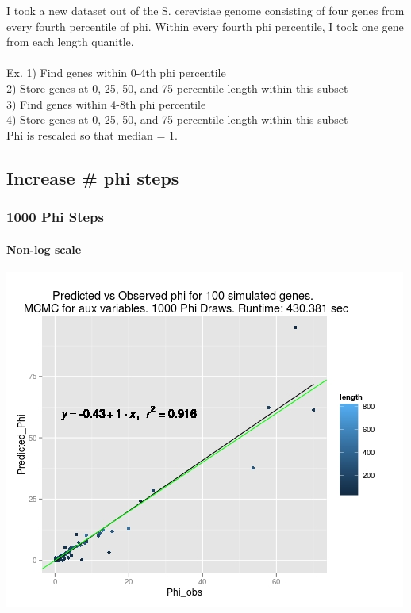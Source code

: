 \documentclass{article}
\begin{document}
 I took a new dataset out of the S. cerevisiae genome consisting of four genes from every fourth percentile of phi. Within every fourth phi percentile, I took one gene from each length quanitle.\\
 \\
 Ex. 1) Find genes within 0-4th phi percentile \\
 2) Store genes at 0, 25, 50, and 75 percentile length within this subset\\
 3) Find genes within 4-8th phi percentile\\
 4) Store genes at 0, 25, 50, and 75 percentile length within this subset\\
 
 Phi is rescaled so that median = 1.
 \pagebreak
 \subsection{Increase # phi steps}
	
	 \subsubsection{1000 Phi Steps}
	 
	 	\paragraph{Non-log scale}	 	
	 	\includegraphics[scale=0.5]{../chosen_100/1000_steps/BIS10/Rplot01.jpeg}
\end{document}

